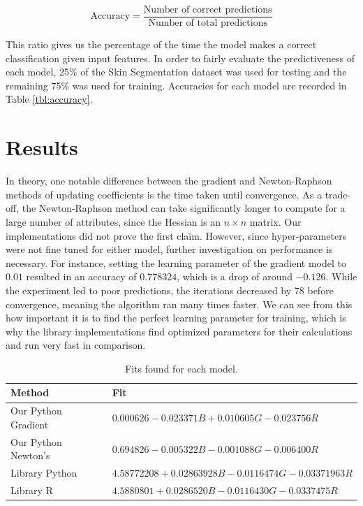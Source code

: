 \documentclass[letterpaper]{article} %
\begin{document}
$$\text{Accuracy} = \frac{\text{Number of correct predictions}}{\text{Number of total predictions}}$$

This ratio gives us the percentage of the time the model makes a correct classification given input features.
In order to fairly evaluate the predictiveness of each model,
25\% of the Skin Segmentation dataset was used for testing and the remaining 75\% was used for training.
Accuracies for each model are recorded in Table \ref{tbl:accuracy}.

\section{Results}
In theory, one notable difference between the gradient and Newton-Raphson methods of updating coefficients
is the time taken until convergence.
As a trade-off, the Newton-Raphson method can take significantly longer to compute for
a large number of attributes, since the Hessian is an $n \times n$ matrix.
Our implementations did not prove the first claim.
However, since hyper-parameters were not fine tuned
for either model, further investigation on performance is necessary.
For instance, setting the learning parameter of the gradient model to $0.01$
resulted in an accuracy of $0.778324$, which is a drop of around $-0.126$.
While the experiment led to poor predictions, the iterations decreased by $78$
before convergence, meaning the algorithm ran many times faster.
We can see from this how important it is to find the perfect learning parameter
for training, which is why the library implementations find
optimized parameters for their calculations and run very fast in comparison.

\begin{table}[t]
\begin{centering}
\bgroup
\def\arraystretch{1.5}
\begin{tabular}{| m{} | m{} |} 
\hline
Method & Fit \\ 
\hline
\hline
Our Python Gradient & $0.000626 - 0.023371B + 0.010605G - 0.023756R$ \\
\hline
Our Python Newton's & $0.694826 - 0.005322B - 0.001088G - 0.006400R$ \\
\hline
\hline
Library Python & $4.58772208 + 0.02863928B - 0.0116474G - 0.03371963R$ \\
\hline
Library R & $4.5880801 + 0.0286520B - 0.0116430G - 0.0337475R$ \\
\hline
\end{tabular}
\caption{Fits found for each model.}
\label{tbl:fits}
\egroup
\end{centering}
\end{table}
\end{document}
